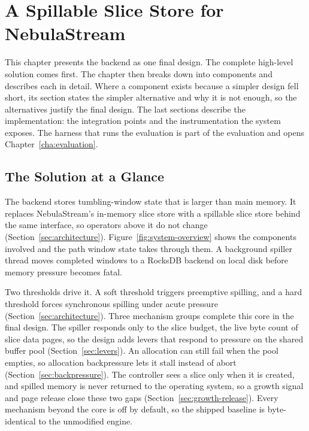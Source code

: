 \chapter{A Spillable Slice Store for NebulaStream\label{cha:solution}}

This chapter presents the backend as one final design.
The complete high-level solution comes first.
The chapter then breaks down into components and describes each in detail.
Where a component exists because a simpler design fell short, its section states the simpler alternative and why it is not enough, so the alternatives justify the final design.
The last sections describe the implementation: the integration points and the instrumentation the system exposes.
The harness that runs the evaluation is part of the evaluation and opens Chapter~\ref{cha:evaluation}.

\section{The Solution at a Glance\label{sec:solution-overview}}

The backend stores tumbling-window state that is larger than main memory.
It replaces NebulaStream's in-memory slice store with a spillable slice store behind the same interface, so operators above it do not change (Section~\ref{sec:architecture}).
Figure~\ref{fig:system-overview} shows the components involved and the path window state takes through them.
A background spiller thread moves completed windows to a RocksDB backend on local disk before memory pressure becomes fatal.


Two thresholds drive it.
A soft threshold triggers preemptive spilling, and a hard threshold forces synchronous spilling under acute pressure (Section~\ref{sec:architecture}).
Three mechanism groups complete this core in the final design.
The spiller responds only to the slice budget, the live byte count of slice data pages, so the design adds levers that respond to pressure on the shared buffer pool (Section~\ref{sec:levers}).
An allocation can still fail when the pool empties, so allocation backpressure lets it stall instead of abort (Section~\ref{sec:backpressure}).
The controller sees a slice only when it is created, and spilled memory is never returned to the operating system, so a growth signal and page release close these two gaps (Section~\ref{sec:growth-release}).
Every mechanism beyond the core is off by default, so the shipped baseline is byte-identical to the unmodified engine.

